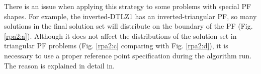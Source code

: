 \documentclass[conference]{IEEEtran}
\begin{document}
There is an issue when applying this strategy to some problems with special PF shapes. 
For example, the inverted-DTLZ1\cite{invertedDTLZ1} has an inverted-triangular PF, 
so many solutions in the final solution set will distribute on the boundary of the PF
(Fig. \ref{rpa2:a})\cite{hisao:RPexplanation, hisao:RPspecify, hisao:dynamic}. 
Although it does not affect the distributions of the solution set 
in triangular PF problems 
(Fig. \ref{rpa2:c} comparing with Fig. \ref{rpa2:d}), 
it is necessary to use a proper reference point specification during the algorithm run.
The reason is explained in detail in\cite{hisao:RPexplanation}.

\begin{figure}[!t]
  \centering
  \quad
  \\
  \quad
  \\

\end{figure}
\end{document}
